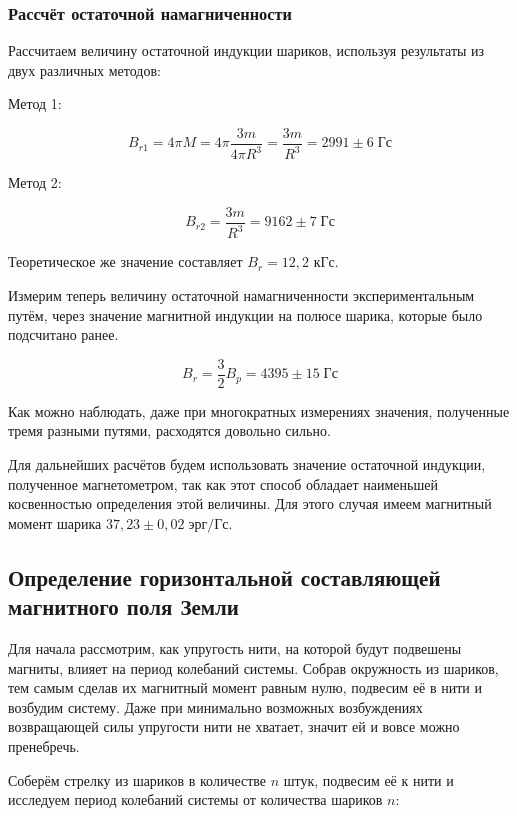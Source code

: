 \subsubsection{Рассчёт остаточной намагниченности}

Рассчитаем величину остаточной индукции шариков, используя результаты из двух различных методов:

Метод 1:

\begin{equation}
    B_{r1} = 4 \pi M = 4 \pi \frac{3m}{4 \pi R^3} = \frac{3m}{R^3} = 2991 \pm 6 \; \text{Гс}
\end{equation}

Метод 2:

\begin{equation}
    B_{r2} = \frac{3m}{R^3} = 9162 \pm 7 \; \text{Гс}
\end{equation}

Теоретическое же значение составляет $B_r = 12,2$ кГс.

Измерим теперь величину остаточной намагниченности экспериментальным путём, через значение магнитной индукции на полюсе шарика, которые было подсчитано ранее.

\begin{equation}
    B_r = \frac{3}{2} B_p = 4395 \pm 15 \; \text{Гс}
\end{equation}

Как можно наблюдать, даже при многократных измерениях значения, полученные тремя разными путями, расходятся довольно сильно.

Для дальнейших расчётов будем использовать значение остаточной индукции, полученное магнетометром, так как этот способ обладает наименьшей косвенностью определения этой величины. Для этого случая имеем магнитный момент шарика $37,23 \pm 0,02 \; \text{эрг}/\text{Гс}$.

\subsection{Определение горизонтальной составляющей магнитного поля Земли}

Для начала рассмотрим, как упругость нити, на которой будут подвешены магниты, влияет на период колебаний системы. Собрав окружность из шариков, тем самым сделав их магнитный момент равным нулю, подвесим её в нити и возбудим систему. Даже при минимально возможных возбуждениях возвращающей силы упругости нити не хватает, значит ей и вовсе можно пренебречь.

Соберём стрелку из шариков в количестве $n$ штук, подвесим её к нити и исследуем период колебаний системы от количества шариков $n$:

